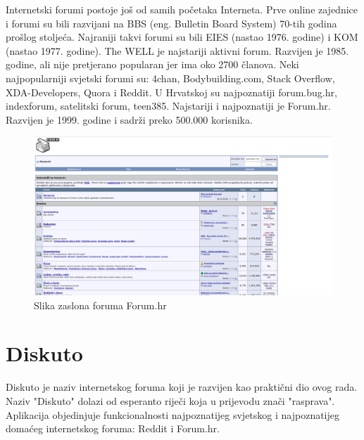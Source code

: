 \documentclass{foi}
\begin{document}
Internetski forumi postoje još od samih početaka Interneta. Prve online zajednice i forumi su bili razvijani na BBS (eng. Bulletin Board System) 70-tih godina prošlog stoljeća. Najraniji takvi forumi su bili EIES (nastao 1976. godine) i KOM (nastao 1977. godine). The WELL je najstariji aktivni forum. Razvijen je 1985. godine, ali nije pretjerano popularan jer ima oko 2700 članova. \cite{forumhistory} Neki najpopularniji svjetski forumi su: 4chan, Bodybuilding.com, Stack Overflow, XDA-Developers, Quora i Reddit. U Hrvatskoj su najpoznatiji forum.bug.hr, indexforum, satelitski forum, teen385. Najstariji i najpoznatiji je Forum.hr. Razvijen je 1999. godine i sadrži preko 500.000 korisnika.

\begin{figure}[h!]
    \centering
    \includegraphics[width=1\textwidth]{slike/forumhr.png}
    \caption{Slika zaslona foruma Forum.hr}
\end{figure}

\section{Diskuto}

Diskuto je naziv internetskog foruma koji je razvijen kao praktični dio ovog rada. Naziv "Diskuto" dolazi od esperanto riječi koja u prijevodu znači "rasprava". Aplikacija objedinjuje funkcionalnosti najpoznatijeg svjetskog i najpoznatijeg domaćeg internetskog foruma: Reddit i Forum.hr.
\end{document}

